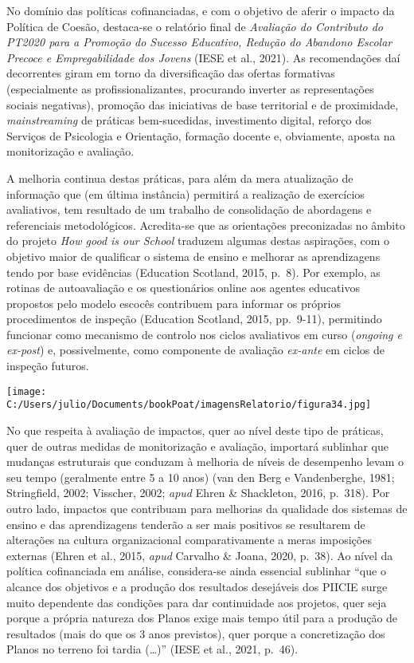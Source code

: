 \documentclass[
]{book}
\begin{document}
No domínio das políticas cofinanciadas, e com o objetivo de aferir o impacto da Política de Coesão, destaca-se o relatório final de \emph{Avaliação do Contributo do PT2020 para a Promoção do Sucesso Educativo, Redução do Abandono Escolar Precoce e Empregabilidade dos Jovens} (IESE et al., 2021). As recomendações daí decorrentes giram em torno da diversificação das ofertas formativas (especialmente as profissionalizantes, procurando inverter as representações sociais negativas), promoção das iniciativas de base territorial e de proximidade, \emph{mainstreaming} de práticas bem-sucedidas, investimento digital, reforço dos Serviços de Psicologia e Orientação, formação docente e, obviamente, aposta na monitorização e avaliação.

A melhoria continua destas práticas, para além da mera atualização de informação que (em última instância) permitirá a realização de exercícios avaliativos, tem resultado de um trabalho de consolidação de abordagens e referenciais metodológicos. Acredita-se que as orientações preconizadas no âmbito do projeto \emph{How good is our School} traduzem algumas destas aspirações, com o objetivo maior de qualificar o sistema de ensino e melhorar as aprendizagens tendo por base evidências (Education Scotland, 2015, p.~8). Por exemplo, as rotinas de autoavaliação e os questionários online aos agentes educativos propostos pelo modelo escocês contribuem para informar os próprios procedimentos de inspeção (Education Scotland, 2015, pp.~9-11), permitindo funcionar como mecanismo de controlo nos ciclos avaliativos em curso (\emph{ongoing e ex-post}) e, possivelmente, como componente de avaliação \emph{ex-ante} em ciclos de inspeção futuros.

\texttt{[image: C:/Users/julio/Documents/bookPoat/imagensRelatorio/figura34.jpg]}

No que respeita à avaliação de impactos, quer ao nível deste tipo de práticas, quer de outras medidas de monitorização e avaliação, importará sublinhar que mudanças estruturais que conduzam à melhoria de níveis de desempenho levam o seu tempo (geralmente entre 5 a 10 anos) (van den Berg e Vandenberghe, 1981; Stringfield, 2002; Visscher, 2002; \emph{apud} Ehren \& Shackleton, 2016, p.~318). Por outro lado, impactos que contribuam para melhorias da qualidade dos sistemas de ensino e das aprendizagens tenderão a ser mais positivos se resultarem de alterações na cultura organizacional comparativamente a meras imposições externas (Ehren et al., 2015, \emph{apud} Carvalho \& Joana, 2020, p.~38). Ao nível da política cofinanciada em análise, considera-se ainda essencial sublinhar ``que o alcance dos objetivos e a produção dos resultados desejáveis dos PIICIE surge muito dependente das condições para dar continuidade aos projetos, quer seja porque a própria natureza dos Planos exige mais tempo útil para a produção de resultados (mais do que os 3 anos previstos), quer porque a concretização dos Planos no terreno foi tardia (\ldots)'' (IESE et al., 2021, p.~46).
\end{document}
